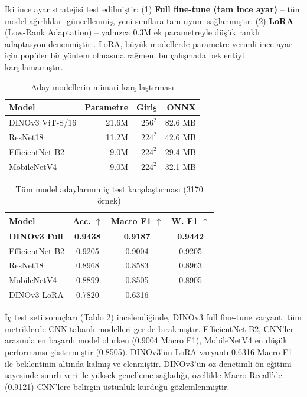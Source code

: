 \documentclass[conference]{IEEEtran}
\begin{document}
İki ince ayar stratejisi test edilmiştir: (1) \textbf{Full fine-tune (tam ince ayar)} -- tüm model ağırlıkları güncellenmiş, yeni sınıflara tam uyum sağlanmıştır. (2) \textbf{LoRA} (Low-Rank Adaptation) -- yalnızca 0.3M ek parametreyle düşük ranklı adaptasyon denenmiştir \cite{hu2022lora}. LoRA, büyük modellerde parametre verimli ince ayar için popüler bir yöntem olmasına rağmen, bu çalışmada beklentiyi karşılamamıştır.

\begin{table}[h]
\centering
\small
\caption{Aday modellerin mimari karşılaştırması}
\label{tab:arch_sizes}
\begin{tabular}{@{}lrrr@{}}
\toprule
\textbf{Model} & \textbf{Parametre} & \textbf{Giriş} & \textbf{ONNX} \\ \midrule
DINOv3 ViT-S/16 & 21.6M & $256^2$ & 82.6 MB \\
ResNet18         & 11.2M & $224^2$ & 42.6 MB \\
EfficientNet-B2  &  9.0M & $224^2$ & 29.4 MB \\
MobileNetV4      &  9.0M & $224^2$ & 32.1 MB \\ \bottomrule
\end{tabular}
\end{table}

\begin{table}[h]
\centering
\scriptsize
\caption{Tüm model adaylarının iç test karşılaştırması (3170 örnek)}
\label{tab:model_comparison}
\begin{tabular}{@{}lccc@{}}
\toprule
\textbf{Model} & \textbf{Acc. $\uparrow$} & \textbf{Macro F1 $\uparrow$} & \textbf{W. F1 $\uparrow$} \\ \midrule
\textbf{DINOv3 Full} & \textbf{0.9438} & \textbf{0.9187} & \textbf{0.9442} \\
EfficientNet-B2 & 0.9205 & 0.9004 & 0.9205 \\
ResNet18 & 0.8968 & 0.8583 & 0.8963 \\
MobileNetV4 & 0.8899 & 0.8505 & 0.8905 \\
DINOv3 LoRA & 0.7820 & 0.6316 & -- \\ \bottomrule
\end{tabular}
\end{table}

İç test seti sonuçları (Tablo \ref{tab:model_comparison}) incelendiğinde, DINOv3 full fine-tune varyantı tüm metriklerde CNN tabanlı modelleri geride bırakmıştır. EfficientNet-B2, CNN'ler arasında en başarılı model olurken (0.9004 Macro F1), MobileNetV4 en düşük performansı göstermiştir (0.8505). DINOv3'ün LoRA varyantı 0.6316 Macro F1 ile beklentinin altında kalmış ve elenmiştir. DINOv3'ün öz-denetimli ön eğitimi sayesinde sınırlı veri ile yüksek genelleme sağladığı, özellikle Macro Recall'de (0.9121) CNN'lere belirgin üstünlük kurduğu gözlemlenmiştir.
\end{document}
